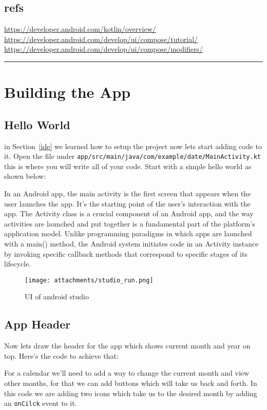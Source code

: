 \documentclass[12pt,oneside]{book}
\begin{document}
\vfill
    \section*{refs} 
    \url{https://developer.android.com/kotlin/overview/} \\
    \url{https://developer.android.com/develop/ui/compose/tutorial/} \\
    \url{https://developer.android.com/develop/ui/compose/modifiers/}
\rule{\textwidth}{0.4pt}

\chapter{Building the App}
    \section{Hello World}
in Section~\ref{ide} we learned how to setup the project now lets start adding code to it. Open the file under \texttt{app/src/main/java/com/example/date/MainActivity.kt} this is where you will write all of your code. Start with a simple hello world as shown below:

In an Android app, the main activity is the first screen that appears when the user launches the app. It's the starting point of the user's interaction with the app. The Activity class is a crucial component of an Android app, and the way activities are launched and put together is a fundamental part of the platform's application model. Unlike programming paradigms in which apps are launched with a main() method, the Android system initiates code in an Activity instance by invoking specific callback methods that correspond to specific stages of its lifecycle.

\begin{figure}
    \centering
    \texttt{[image: attachments/studio\_run.png]}
    \caption{UI of android studio}
\end{figure}
\newpage

    \section{App Header}
Now lets draw the header for the app which shows current month and year on top. Here's the code to achieve that:
\newpage

For a calendar we'll need to add a way to change the current month and view other months, for that we can add buttons which will take us back and forth. In this code we are adding two icons which take us to the desired month by adding an \texttt{onCilck} event to it.
\newpage
\end{document}
